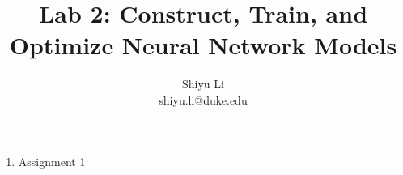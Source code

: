 \documentclass[11pt]{article}
\begin{document}
\author{Shiyu Li \\ shiyu.li@duke.edu}
\title{Lab 2: Construct, Train, and Optimize Neural Network Models}
\maketitle

\medskip

\begin{enumerate}

\item
Assignment 1


\end{enumerate}
\end{document}

